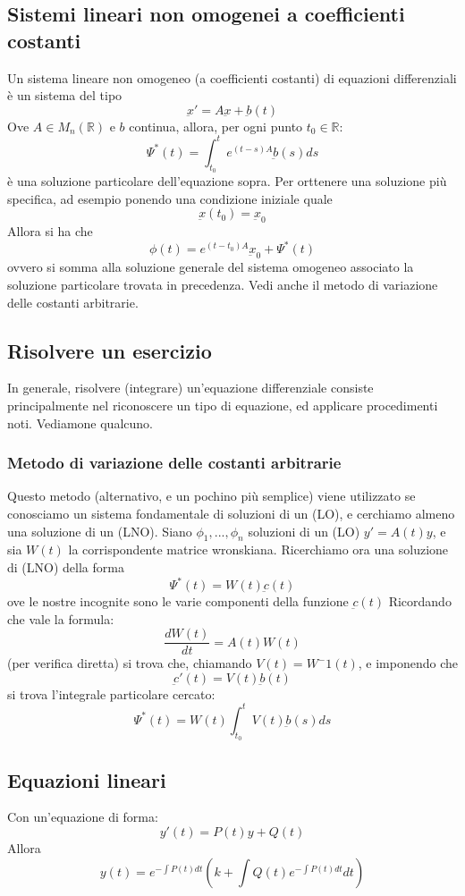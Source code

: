 \documentclass[a4paper,12pt]{article}
\begin{document}
\subsection{Sistemi lineari non omogenei a coefficienti costanti}
Un sistema lineare non omogeneo (a coefficienti costanti) di equazioni differenziali è un sistema del tipo
$$\underbar{x}'=A\underbar{x}+\underbar{b}(t)$$
Ove $A\in M_n(\mathbb{R})$ e $b$ continua, allora, per ogni punto $t_0 \in \mathbb{R}$:
$$\Psi^*(t)= \int_{t_0}^t e^{(t-s)A} \underbar{b}(s)ds$$
è una soluzione particolare dell'equazione sopra.
Per orttenere una soluzione più specifica, ad esempio ponendo una condizione iniziale quale
$$\underbar{x}(t_0)=\underbar{x}_0$$
Allora si ha che
$$\phi(t)=e^{(t-t_0)A}\underbar{x}_0+\Psi^*(t)$$
ovvero si somma alla soluzione generale del sistema omogeneo associato la soluzione particolare trovata in precedenza.
Vedi anche il metodo di variazione delle costanti arbitrarie.

\subsection{Risolvere un esercizio}
In generale, risolvere (integrare) un'equazione differenziale consiste principalmente nel riconoscere un tipo di equazione, ed applicare procedimenti noti. Vediamone qualcuno.

\subsubsection{Metodo di variazione delle costanti arbitrarie}
Questo metodo (alternativo, e un pochino più semplice) viene utilizzato se conosciamo un sistema fondamentale di soluzioni di un (LO), e cerchiamo almeno una soluzione di un (LNO).
Siano $\phi_1,...,\phi_n$ soluzioni di un (LO) $y'= A(t)y$, e sia $W(t)$ la corrispondente matrice wronskiana.
Ricerchiamo ora una soluzione di (LNO) della forma
$$\Psi^*(t)=W(t)\underbar{c}(t)$$
ove le nostre incognite sono le varie componenti della funzione $\underbar{c}(t)$
Ricordando che vale la formula:
$$\frac{dW(t)}{dt} = A(t)W(t)$$
(per verifica diretta) si trova che, chiamando $V(t) = W^-1(t)$, e imponendo che $$\underbar{c}'(t) = V(t)\underbar{b}(t)$$
si trova l'integrale particolare cercato:
$$\Psi^*(t)= W(t)\int_{t_0}^t V(t)\underbar{b}(s) ds$$

\subsection{Equazioni lineari}
Con un'equazione di forma:
$$y'(t) = P(t)y+Q(t)$$
Allora
$$y(t)=e^{- \displaystyle\int P(t)dt}\left(k + \int Q(t)e^{-\displaystyle\int P(t)dt}dt\right)$$
\end{document}
